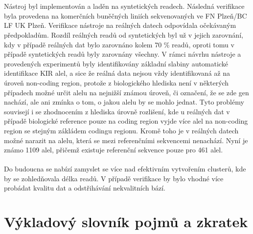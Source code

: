 \documentclass[czech,DP]{thesiskiv}
\numberwithin{equation}{section}
\begin{document}
\\
\\
Nástroj byl implementován a laděn na syntetických readech. Následná verifikace byla provedena na komerčních buněčných liniích sekvenovaných ve FN Plzeň/BC LF UK Plzeň. Verifikace nástroje na reálných datech odpovídala očekávaným předpokladům. Rozdíl reálných readů od syntetických byl už v jejich zarovnání, kdy v případě reálných dat bylo zarovnáno kolem 70 \% readů, oproti tomu v případě syntetických readů byly zarovnány všechny. V rámci návrhu nástroje a provedených experimentů byly identifikovány základní slabiny automatické identifikace KIR alel, a sice že reálná data nejsou vždy identifikovaná až na úroveň non-coding region, protože z biologického hlediska není v některých případech možné určit alelu na nejnižší známou úroveň, či označení, že se zde gen nachází, ale ani zmínka o tom, o jakou alelu by se mohlo jednat. Tyto problémy souvisejí i se zhodnocením z hlediska úrovně rozlišení, kde u reálných dat v případě biologické reference pouze na coding region vyjde více alel na non-coding region se stejným zákládem codingu regionu. Kromě toho je v reálných datech možné narazit na alelu, která se mezi referenčními sekvencemi nenachází. Nyní je známo 1109 alel, přičemž existuje referenční sekvence pouze pro 461 alel.
\\
\\
Do budoucna se nabízí zamyslet se více nad efektivním vytvořením clusterů, kde by se zohledňovala délka readů. V případě verifikace by bylo vhodné více probádat kvalitu dat a odstřihávání nekvalitních bází. 


\chapter{Výkladový slovník pojmů a zkratek}
\end{document}
